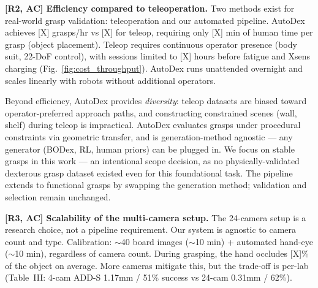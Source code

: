 \documentclass[conference]{IEEEtran}
\newcommand{\rtwo}{{\color{R2}R2}}
\newcommand{\rthree}{{\color{R3}R3}}
\newcommand{\acmark}{{\color{AC}AC}}
\newcommand{\rssparagraph}[1]{{\bf #1.}}
\begin{document}


\rssparagraph{[\rtwo, \acmark] Efficiency compared to teleoperation}
Two methods exist for real-world grasp validation: teleoperation and our automated pipeline. AutoDex achieves [X] grasps/hr vs [X] for teleop, requiring only [X] min of human time per grasp (object placement). Teleop requires continuous operator presence (body suit, 22-DoF control), with sessions limited to [X] hours before fatigue and Xsens charging (Fig.~\ref{fig:cost_throughput}). AutoDex runs unattended overnight and scales linearly with robots without additional operators.

Beyond efficiency, AutoDex provides \emph{diversity}: teleop datasets are biased toward operator-preferred approach paths, and constructing constrained scenes (wall, shelf) during teleop is impractical. AutoDex evaluates grasps under procedural constraints via geometric transfer, and is generation-method agnostic --- any generator (BODex, RL, human priors) can be plugged in. We focus on stable grasps in this work --- an intentional scope decision, as no physically-validated dexterous grasp dataset existed even for this foundational task. The pipeline extends to functional grasps by swapping the generation method; validation and selection remain unchanged.


\rssparagraph{[\rthree, \acmark] Scalability of the multi-camera setup}
The 24-camera setup is a research choice, not a pipeline requirement. Our system is agnostic to camera count and type. Calibration: $\sim$40 board images ($\sim$10 min) + automated hand-eye ($\sim$10 min), regardless of camera count. During grasping, the hand occludes [X]\% of the object on average. More cameras mitigate this, but the trade-off is per-lab (Table~III: 4-cam ADD-S 1.17mm / 51\% success vs 24-cam 0.31mm / 62\%).

{
  \small
  
  
}
\end{document}
